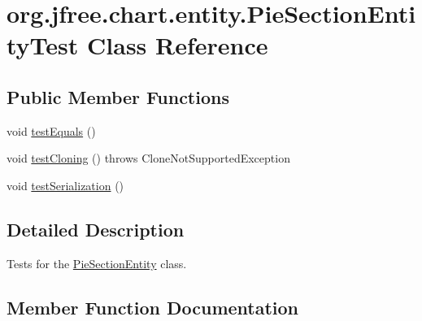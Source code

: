 \hypertarget{classorg_1_1jfree_1_1chart_1_1entity_1_1_pie_section_entity_test}{}\section{org.\+jfree.\+chart.\+entity.\+Pie\+Section\+Entity\+Test Class Reference}
\label{classorg_1_1jfree_1_1chart_1_1entity_1_1_pie_section_entity_test}
\subsection*{Public Member Functions}
\begin{DoxyCompactItemize}
\item 
void \mbox{\hyperlink{classorg_1_1jfree_1_1chart_1_1entity_1_1_pie_section_entity_test_a4f0ad4ac1967c1262589ed0868298bdf}{test\+Equals}} ()
\item 
void \mbox{\hyperlink{classorg_1_1jfree_1_1chart_1_1entity_1_1_pie_section_entity_test_a955b0b822c46cdeb7fee01f1f7f59c2d}{test\+Cloning}} ()  throws Clone\+Not\+Supported\+Exception 
\item 
void \mbox{\hyperlink{classorg_1_1jfree_1_1chart_1_1entity_1_1_pie_section_entity_test_a2dd0931dd921cac7b5444226c1dfdd20}{test\+Serialization}} ()
\end{DoxyCompactItemize}


\subsection{Detailed Description}
Tests for the \mbox{\hyperlink{classorg_1_1jfree_1_1chart_1_1entity_1_1_pie_section_entity}{Pie\+Section\+Entity}} class. 

\subsection{Member Function Documentation}
\mbox{\label{classorg_1_1jfree_1_1chart_1_1entity_1_1_pie_section_entity_test_a955b0b822c46cdeb7fee01f1f7f59c2d}} 
